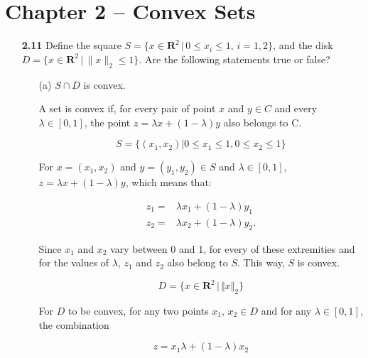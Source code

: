 \documentclass[11pt,a4paper]{article}
\begin{document}
\section*{Chapter 2 -- Convex Sets}

\begin{itemize}
    \item[\textbf{2.11}] Define the square $S = \{x \in \mathbf{R}^2 \,\vert\, 0 \leq x_i \leq 1, \, i = 1, 2\}$, and the disk $D = \{x \in \mathbf{R}^2 \, \vert \, \|x\|_2 \leq 1\}$. Are the following statements true or false?
    \item[] \begin{itemize}
        \item[(a)] $S \cap D$ is convex.
            
        A set is convex if, for every pair of point $x$ and $y \in C$ and every $\lambda \in [0, 1]$, the point $z = \lambda x + (1-\lambda)y$ also belongs to C. 

        \begin{equation*}
            S = \{(x_1, x_2) \vert 0 \leq x_1 \leq 1, 0 \leq x_2 \leq 1\}
        \end{equation*}
        
        For $x = (x_1, x_2)$ and $y = (y_1, y_2) \in S$ and $\lambda \in [0, 1]$, $z = \lambda x + (1- \lambda)y$, which means that:
        
        \begin{equation*}
            \begin{aligned}
                z_1 = & \lambda x_1 + (1- \lambda)y_1\\ 
                z_2 = & \lambda x_2 + (1- \lambda)y_2.
            \end{aligned}
        \end{equation*}

        Since $x_1$ and $x_2$ vary between 0 and 1, for every of these extremities and for the values of $\lambda$, $z_1$ and $z_2$ also belong to $S$. This way, $S$ is convex.

        \begin{equation*}
            D = \{x \in \mathbf{R}^2 \,\vert\, \Vert x \Vert_2\}
        \end{equation*}

        For $D$ to be convex, for any two points $x_1$, $x_2 \in D$ and for any $\lambda \in [0,1]$, the combination

        \begin{equation*}
            z = x_1 \lambda + (1-\lambda)x_2
        \end{equation*}


\end{itemize}
\end{itemize}
\end{document}

